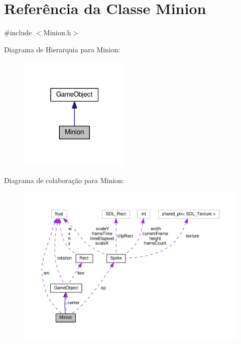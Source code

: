 \hypertarget{classMinion}{\section{Referência da Classe Minion}
\label{classMinion}
}


{\ttfamily \#include $<$Minion.\+h$>$}



Diagrama de Hierarquia para Minion\+:\nopagebreak
\begin{figure}[H]
\begin{center}
\leavevmode
\includegraphics[width=151pt]{classMinion__inherit__graph}
\end{center}
\end{figure}


Diagrama de colaboração para Minion\+:\nopagebreak
\begin{figure}[H]
\begin{center}
\leavevmode
\includegraphics[width=350pt]{classMinion__coll__graph}
\end{center}
\end{figure}
